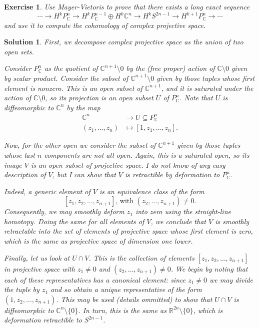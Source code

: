 \documentclass{article}
\newtheorem{ex}{Exercise}
\theoremstyle{nonumberplain}
\newtheorem{sol}{Solution}
\newcommand{\R}{\mathbb{R}}
\newcommand{\C}{\mathbb{C}}
\begin{document}
\begin{ex}
Use Mayer-Vietoris to prove that there exists a long exact sequence
\[\cdots \rightarrow H^k P^n_\C \to H^k P^{n-1}_\C \oplus H^k \C^n \to H^k S^{2n-1} \to H^{k+1} P^n_\C \to \cdots\]
and use it to compute the cohomology of complex projective space.
\end{ex}

\begin{sol}
First, we decompose complex projective space as the union of two open sets.

Consider $P^n_\C$ as the quotient of $\C^{n+1} \setminus 0$ by the (free proper) action of $\C \setminus 0$ given by scalar product. Consider the subset of $\C^{n+1} \setminus 0$ given by those tuples whose first element is nonzero. This is an open subset of $\C^{n+1}$, and it is saturated under the action of $\C \setminus 0$, so its projection is an open subset $U$ of $P^n_\C$. Note that $U$ is diffeomorphic to $\C^n$ by the map
\begin{align*}
\C^n &\to U \subseteq P^n_\C\\
(z_1, \dots, z_n) &\mapsto [1,z_1,\dots,z_n].
\end{align*}

Now, for the other open we consider the subset of $\C^{n+1}$ given by those tuples whose last $n$ components are not all open. Again, this is a saturated open, so its image $V$ is an open subset of projective space. I do not know of any easy description of $V$, but I can show that $V$ is retractible by deformation to $P^n_\C$.

Indeed, a generic element of $V$ is an equivalence class of the form
\[ [z_1, z_2, \dots, z_{n+1}]\text{, with $(z_2, \dots, z_{n+1}) \neq 0$.}\] Consequently, we may smoothly deform $z_1$ into zero using the straight-line homotopy. Doing the same for all elements of $V$, we conclude that $V$ is smoothly retractable into the set of elements of projective space whose first element is zero, which is the same as projective space of dimension one lower.


Finally, let us look at $U \cap V$. This is the collection of elements $[z_1, z_2, \dots, z_{n+1}]$ in projective space with $z_1 \neq 0$ and $(z_2, \dots, z_{n+1}) \neq 0$. We begin by noting that each of these representatives has a canonical element: since $z_1 \neq 0$ we may divide the tuple by $z_1$ and so obtain a unique representative of the form $(1, z_2, \dots, z_{n+1})$. This may be used (details ommitted) to show that $U \cap V$ is diffeomorphic to $\C^n \setminus \{0\}$. In turn, this is the same as $\R^{2n} \setminus \{0\}$, which is deformation retractible to $S^{2n-1}$.


\end{sol}
\end{document}
